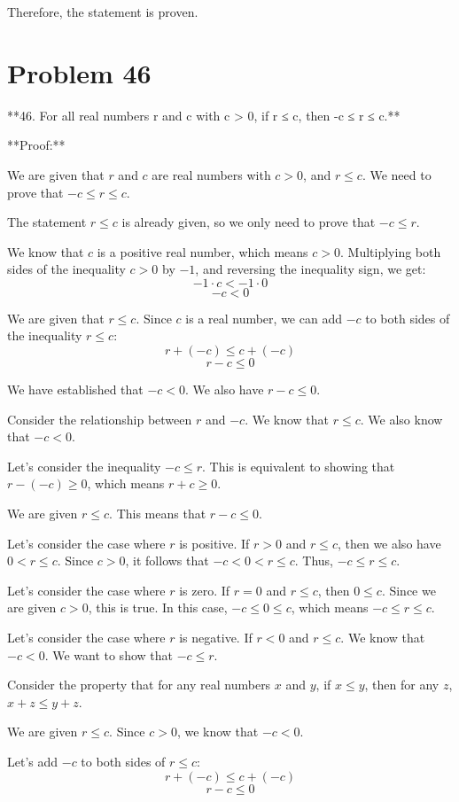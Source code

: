 \documentclass{article}
\begin{document}
Therefore, the statement is proven.

\newpage

\section*{Problem 46}
**46. For all real numbers r and c with c > 0, if r ≤ c, then -c ≤ r ≤ c.**

**Proof:**

We are given that $r$ and $c$ are real numbers with $c > 0$, and $r \le c$. We need to prove that $-c \le r \le c$.

The statement $r \le c$ is already given, so we only need to prove that $-c \le r$.

We know that $c$ is a positive real number, which means $c > 0$.
Multiplying both sides of the inequality $c > 0$ by $-1$, and reversing the inequality sign, we get:
$$ -1 \cdot c < -1 \cdot 0 $$
$$ -c < 0 $$

We are given that $r \le c$.
Since $c$ is a real number, we can add $-c$ to both sides of the inequality $r \le c$:
$$ r + (-c) \le c + (-c) $$
$$ r - c \le 0 $$

We have established that $-c < 0$.
We also have $r - c \le 0$.

Consider the relationship between $r$ and $-c$.
We know that $r \le c$.
We also know that $-c < 0$.

Let's consider the inequality $-c \le r$.
This is equivalent to showing that $r - (-c) \ge 0$, which means $r + c \ge 0$.

We are given $r \le c$.
This means that $r - c \le 0$.

Let's consider the case where $r$ is positive. If $r > 0$ and $r \le c$, then we also have $0 < r \le c$. Since $c > 0$, it follows that $-c < 0 < r \le c$. Thus, $-c \le r \le c$.

Let's consider the case where $r$ is zero. If $r = 0$ and $r \le c$, then $0 \le c$. Since we are given $c > 0$, this is true. In this case, $-c \le 0 \le c$, which means $-c \le r \le c$.

Let's consider the case where $r$ is negative. If $r < 0$ and $r \le c$.
We know that $-c < 0$.
We want to show that $-c \le r$.

Consider the property that for any real numbers $x$ and $y$, if $x \le y$, then for any $z$, $x+z \le y+z$.

We are given $r \le c$.
Since $c > 0$, we know that $-c < 0$.

Let's add $-c$ to both sides of $r \le c$:
$$ r + (-c) \le c + (-c) $$
$$ r - c \le 0 $$
\end{document}
